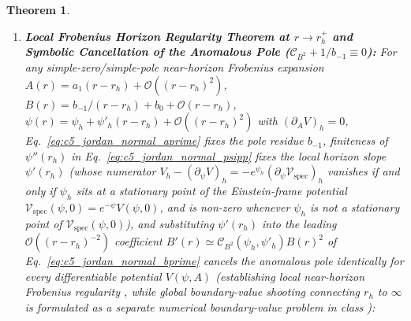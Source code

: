 \documentclass[11pt,a4paper]{article}
\newcommand{\catD}{\text{\textbf{\textcolor{blue!75!black}{[D]}}}}
\newcommand{\catN}{\text{\textbf{\textcolor{teal!75!black}{[N]}}}}
\theoremstyle{definition}
\theoremstyle{plain}
\newtheorem{theorem}[axiom]{Theorem}
\theoremstyle{remark}
\begin{document}
\begin{theorem}
\begin{enumerate}[label=(\alph*)]
  \begin{equation}\label{eq:c5_jordan_radial_bianchi}
  \nabla_A\mathcal{T}^A_{\;r} \equiv \frac{d\mathcal{T}^r_{\;r}}{dr} + \frac{A'}{2A}\left(\mathcal{T}^r_{\;r} - \mathcal{T}^1_{\;1}\right) + \psi'\left(\mathcal{T}^r_{\;r} - \mathcal{T}^2_{\;2}\right) + \frac{2}{r}\left(\mathcal{T}^r_{\;r} - \mathcal{T}^\theta_{\;\theta}\right) \equiv 0 \;\;\catD,
  \end{equation}
  and solving $G^A_{\;B} = \mathcal{T}^A_{\;B}$ for $(A'(r), B'(r), \psi''(r))$ yields the unique normal-form system under which all four Einstein equations $E^1_{\;1} = E^2_{\;2} = E^r_{\;r} = E^\theta_{\;\theta} \equiv 0$ vanish identically:
  \begin{align}
  A'(r) &= -\frac{2\,A(r)\left[r^2 B(r)V(\psi, A) + 2r\,\psi'(r) - B(r) + 1\right]}{r\left(r\,\psi'(r) + 2\right)} \;\;\catD, \label{eq:c5_jordan_normal_aprime} \\[4pt]
  B'(r) &= \frac{2B(r)}{3\,r\left(r\,\psi'(r) + 2\right)}\bigg[r^3 B\left(2A\frac{\partial V}{\partial A} + 2V + \frac{\partial V}{\partial\psi}\right)\psi' \nonumber \\
  &\quad + r^2 B\left(4A\frac{\partial V}{\partial A} + V + 2\frac{\partial V}{\partial\psi}\right) + 3r^2(\psi')^2 - 3(r\psi' + 1)(B - 1)\bigg] \;\;\catD, \label{eq:c5_jordan_normal_bprime} \\[4pt]
  \psi''(r) &= \frac{1}{3\,r}\bigg[r^2 B\left(2A\frac{\partial V}{\partial A} + 2V + \frac{\partial V}{\partial\psi}\right)\psi' \nonumber \\
  &\quad - 2rB\left(A\frac{\partial V}{\partial A} + V - \frac{\partial V}{\partial\psi}\right) - 3(B + 1)\psi'\bigg] \;\;\catD. \label{eq:c5_jordan_normal_psipp}
  \end{align}
  \item \textbf{Local Frobenius Horizon Regularity Theorem at $r \to r_h^+$ and Symbolic Cancellation of the Anomalous Pole ($\mathcal{C}_{B^2} + 1/b_{-1} \equiv 0$):}
  For any simple-zero/simple-pole near-horizon Frobenius expansion $A(r) = a_1(r - r_h) + \mathcal{O}((r - r_h)^2)$, $B(r) = b_{-1}/(r - r_h) + b_0 + \mathcal{O}(r - r_h)$, $\psi(r) = \psi_h + \psi'_h(r - r_h) + \mathcal{O}((r - r_h)^2)$ with $(\partial_A V)_h = 0$, Eq.~\eqref{eq:c5_jordan_normal_aprime} fixes the pole residue $b_{-1}$, finiteness of $\psi''(r_h)$ in Eq.~\eqref{eq:c5_jordan_normal_psipp} fixes the local horizon slope $\psi'(r_h)$ (whose numerator $V_h - (\partial_\psi V)_h = -e^{\psi_h}(\partial_\psi\mathcal{V}_{\mathrm{spec}})_h$ vanishes if and only if $\psi_h$ sits at a stationary point of the Einstein-frame potential $\mathcal{V}_{\mathrm{spec}}(\psi, 0) = e^{-\psi}V(\psi, 0)$, and is non-zero whenever $\psi_h$ is not a stationary point of $\mathcal{V}_{\mathrm{spec}}(\psi, 0)$), and substituting $\psi'(r_h)$ into the leading $\mathcal{O}((r - r_h)^{-2})$ coefficient $B'(r) \simeq \mathcal{C}_{B^2}(\psi_h, \psi'_h)B(r)^2$ of Eq.~\eqref{eq:c5_jordan_normal_bprime} cancels the anomalous pole identically for every differentiable potential $V(\psi, A)$ (establishing local near-horizon Frobenius regularity \catD, while global boundary-value shooting connecting $r_h$ to $\infty$ is formulated as a separate numerical boundary-value problem in class \catN):

\end{enumerate}
\end{theorem}
\end{document}
